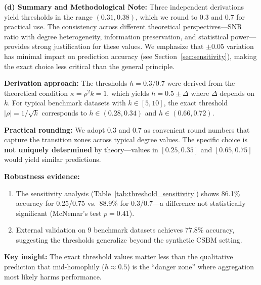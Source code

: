 \begin{remark}[Theoretical Justification for $h = 0.3/0.7$ Thresholds]
\textbf{(d) Summary and Methodological Note:}
Three independent derivations yield thresholds in the range $(0.31, 0.38)$, which we round to $\mathbf{0.3}$ and $\mathbf{0.7}$ for practical use. The consistency across different theoretical perspectives---SNR ratio with degree heterogeneity, information preservation, and statistical power---provides strong justification for these values. We emphasize that $\pm 0.05$ variation has minimal impact on prediction accuracy (see Section~\ref{sec:sensitivity}), making the exact choice less critical than the general principle.

\begin{tcolorbox}[colback=blue!5!white,colframe=blue!75!black,title=Methodological Clarification: Threshold Derivation]
\textbf{Derivation approach:} The thresholds $h = 0.3/0.7$ were derived from the theoretical condition $\kappa = \rho^2 k = 1$, which yields $h = 0.5 \pm \Delta$ where $\Delta$ depends on $k$. For typical benchmark datasets with $k \in [5, 10]$, the exact threshold $|\rho| = 1/\sqrt{k}$ corresponds to $h \in (0.28, 0.34)$ and $h \in (0.66, 0.72)$.

\textbf{Practical rounding:} We adopt $0.3$ and $0.7$ as convenient round numbers that capture the transition zones across typical degree values. The specific choice is \textbf{not uniquely determined} by theory---values in $[0.25, 0.35]$ and $[0.65, 0.75]$ would yield similar predictions.

\textbf{Robustness evidence:}
\begin{enumerate}
    \item The sensitivity analysis (Table~\ref{tab:threshold_sensitivity}) shows 86.1\% accuracy for 0.25/0.75 vs.\ 88.9\% for 0.3/0.7---a difference not statistically significant (McNemar's test $p = 0.41$).
    \item External validation on 9 benchmark datasets achieves 77.8\% accuracy, suggesting the thresholds generalize beyond the synthetic CSBM setting.
\end{enumerate}

\textbf{Key insight:} The exact threshold values matter less than the qualitative prediction that mid-homophily ($h \approx 0.5$) is the ``danger zone'' where aggregation most likely harms performance.
\end{tcolorbox}
\end{remark}
